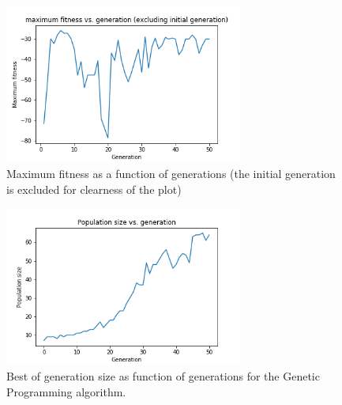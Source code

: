\documentclass{article}
\begin{document}
 \begin{figure}[H]
    \centering
    \includegraphics[width=0.7\textwidth]{Assignment 1/Figures/A1_8a2.png}
    \caption{Maximum fitness as a function of generations (the initial generation is excluded for clearness of the plot)}
    \label{fig:A1_8a2}
\end{figure}

 \begin{figure}[H]
    \centering
    \includegraphics[width=0.7\textwidth]{Assignment 1/Figures/A1_8a1.png}
    \caption{Best of generation size as function of generations for the Genetic Programming algorithm.}
    \label{fig:A1_8a1}
\end{figure}
    

 
 
 


\end{document}
